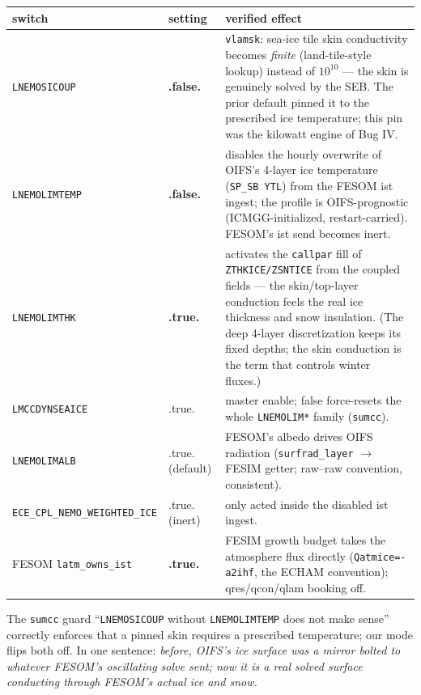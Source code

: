 \documentclass[11pt,a4paper]{article}
\newcommand{\code}[1]{\texttt{\small #1}}
\begin{document}
\begin{center}
\begin{tabular}{@{}llp{8.6cm}@{}}
\toprule
switch & setting & verified effect \\
\midrule
\code{LNEMOSICOUP} & \textbf{.false.} & \code{vlamsk}: sea-ice tile skin conductivity becomes
  \emph{finite} (land-tile-style lookup) instead of $10^{10}$ --- the skin is genuinely solved by
  the SEB. The prior default pinned it to the prescribed ice temperature; this pin was the
  kilowatt engine of Bug IV. \\
\code{LNEMOLIMTEMP} & \textbf{.false.} & disables the hourly overwrite of OIFS's 4-layer ice
  temperature (\code{SP\_SB YTL}) from the FESOM ist ingest; the profile is OIFS-prognostic
  (ICMGG-initialized, restart-carried). FESOM's ist send becomes inert. \\
\code{LNEMOLIMTHK} & \textbf{.true.} & activates the \code{callpar} fill of
  \code{ZTHKICE/ZSNTICE} from the coupled fields --- the skin/top-layer conduction feels the real
  ice thickness and snow insulation. (The deep 4-layer discretization keeps its fixed depths;
  the skin conduction is the term that controls winter fluxes.) \\
\code{LMCCDYNSEAICE} & .true. & master enable; false force-resets the whole \code{LNEMOLIM*}
  family (\code{sumcc}). \\
\code{LNEMOLIMALB} & .true. (default) & FESOM's albedo drives OIFS radiation
  (\code{surfrad\_layer} $\to$ FESIM getter; raw--raw convention, consistent). \\
\code{ECE\_CPL\_NEMO\_WEIGHTED\_ICE} & .true. (inert) & only acted inside the disabled ist ingest. \\
FESOM \code{latm\_owns\_ist} & \textbf{.true.} & FESIM growth budget takes the atmosphere flux
  directly (\code{Qatmice=-a2ihf}, the ECHAM convention); qres/qcon/qlam booking off. \\
\bottomrule
\end{tabular}
\end{center}

\noindent
The \code{sumcc} guard ``\code{LNEMOSICOUP} without \code{LNEMOLIMTEMP} does not make sense''
correctly enforces that a pinned skin requires a prescribed temperature; our mode flips both off.
In one sentence: \emph{before, OIFS's ice surface was a mirror bolted to whatever FESOM's
oscillating solve sent; now it is a real solved surface conducting through FESOM's actual ice and
snow.}
\end{document}
